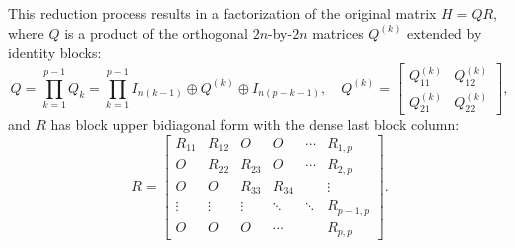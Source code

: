 \documentclass{llncs}
\begin{document}
This reduction process results in a factorization of the original matrix 
$H = QR$, where $Q$ is a product of 
the orthogonal $2n$-by-$2n$ matrices $Q^{(k)}$ extended 
by identity blocks: 
\begin{equation*} %
  Q = \prod_{k=1}^{p-1} Q_k = 
  \prod_{k=1}^{p-1} I_{n(k-1)}\oplus Q^{(k)} \oplus I_{n(p-k-1)}
  ,\quad %
  Q^{(k)} = 
  \begin{bmatrix}
    Q_{11}^{(k)} & Q_{12}^{(k)}\\
    Q_{21}^{(k)} & Q_{22}^{(k)}
  \end{bmatrix},
\end{equation*}
and $R$ has block upper bidiagonal form with 
the dense last block column:
\begin{equation}
  \label{eq:matr_R}
  R =
  \begin{bmatrix}
    R_{11} & R_{12} & O     & O     & \cdots & R_{1,p} \\
    O     & R_{22} & R_{23} & O     & \cdots & R_{2,p} \\
    O     & O     & R_{33} & R_{34} & & \vdots \\
    \vdots  & \vdots & \vdots& \ddots & \ddots & R_{p-1,p}  \\
    O   & O   &  O  & \cdots & & R_{p,p}
  \end{bmatrix}.
\end{equation}
\end{document}
